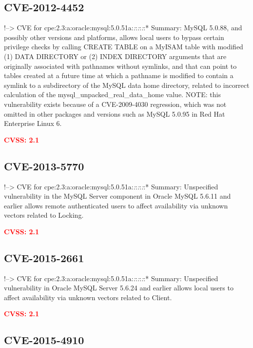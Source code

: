 \documentclass[a4paper, 12pt]{article}
\begin{document}
\hypertarget{cve-2012-4452}{%
\subsection{CVE-2012-4452}\label{cve-2012-4452}}

!--\textgreater{} CVE for
cpe:2.3:a:oracle:mysql:5.0.51a:\emph{:}:\emph{:}:\emph{:}:* Summary:
MySQL 5.0.88, and possibly other versions and platforms, allows local
users to bypass certain privilege checks by calling CREATE TABLE on a
MyISAM table with modified (1) DATA DIRECTORY or (2) INDEX DIRECTORY
arguments that are originally associated with pathnames without
symlinks, and that can point to tables created at a future time at which
a pathname is modified to contain a symlink to a subdirectory of the
MySQL data home directory, related to incorrect calculation of the
mysql\_unpacked\_real\_data\_home value. NOTE: this vulnerability exists
because of a CVE-2009-4030 regression, which was not omitted in other
packages and versions such as MySQL 5.0.95 in Red Hat Enterprise Linux
6.

\textbf{\textcolor{red}{CVSS: 2.1}}

\hypertarget{cve-2013-5770}{%
\subsection{CVE-2013-5770}\label{cve-2013-5770}}

!--\textgreater{} CVE for
cpe:2.3:a:oracle:mysql:5.0.51a:\emph{:}:\emph{:}:\emph{:}:* Summary:
Unspecified vulnerability in the MySQL Server component in Oracle MySQL
5.6.11 and earlier allows remote authenticated users to affect
availability via unknown vectors related to Locking.

\textbf{\textcolor{red}{CVSS: 2.1}}

\hypertarget{cve-2015-2661}{%
\subsection{CVE-2015-2661}\label{cve-2015-2661}}

!--\textgreater{} CVE for
cpe:2.3:a:oracle:mysql:5.0.51a:\emph{:}:\emph{:}:\emph{:}:* Summary:
Unspecified vulnerability in Oracle MySQL Server 5.6.24 and earlier
allows local users to affect availability via unknown vectors related to
Client.

\textbf{\textcolor{red}{CVSS: 2.1}}

\hypertarget{cve-2015-4910}{%
\subsection{CVE-2015-4910}\label{cve-2015-4910}}
\end{document}
